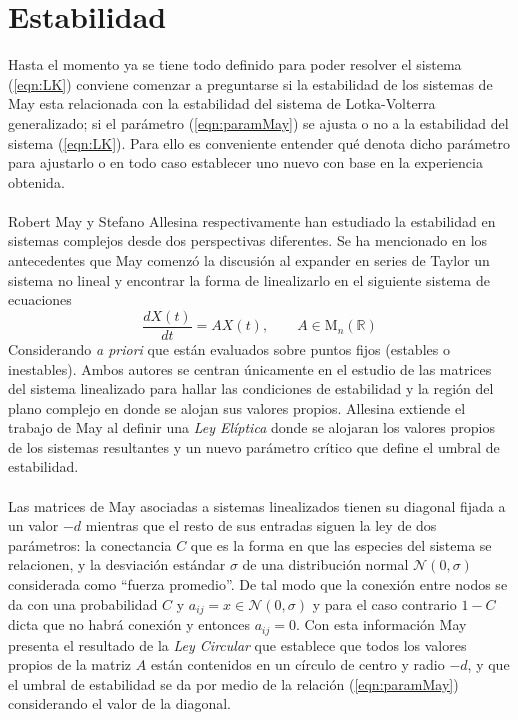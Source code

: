 \section{Estabilidad}

Hasta el momento ya se tiene todo definido para poder resolver el sistema (\ref{eqn:LK}) conviene comenzar a preguntarse si la estabilidad de los sistemas de May esta relacionada con la estabilidad del sistema de Lotka-Volterra generalizado; si el parámetro (\ref{eqn:paramMay}) se ajusta o no a la estabilidad del sistema (\ref{eqn:LK}). Para ello es conveniente entender qué denota dicho parámetro para ajustarlo o en todo caso establecer uno nuevo con base en la experiencia obtenida.\\
\\
Robert May \cite{may2019stability} y Stefano Allesina \cite{allesina2012stability} respectivamente han estudiado la estabilidad en sistemas complejos desde dos perspectivas diferentes. Se ha mencionado en los antecedentes que May comenzó la discusión al expander en series de Taylor un sistema no lineal y encontrar la forma de linealizarlo en el siguiente sistema de ecuaciones
\begin{equation}\label{eqn:sistemasMay}
	\frac{dX(t)}{dt}=AX(t),\qquad A\in\mathrm{M}_n(\mathbb{R})
\end{equation}
Considerando \textit{a priori} que están evaluados sobre puntos fijos (estables o inestables). Ambos autores se centran únicamente en el estudio de las matrices del sistema linealizado para hallar las condiciones de estabilidad y la región del plano complejo en donde se alojan sus valores propios. Allesina extiende el trabajo de May al definir una \textit{Ley Elíptica} donde se alojaran los valores propios de los sistemas resultantes y un nuevo parámetro crítico que define el umbral de estabilidad. 
\\
\\
Las matrices de May asociadas a sistemas linealizados tienen su diagonal fijada a un valor $-d$ mientras que el resto de sus entradas siguen la ley de dos parámetros: la conectancia $C$ que es la forma en que las especies del sistema se relacionen, y la desviación estándar $\sigma$ de una distribución normal $\mathcal{N}(0,\sigma)$ considerada como ``fuerza promedio''. De tal modo que la conexión entre nodos se da con una probabilidad $C$ y $a_{ij}=x\in\mathcal{N}(0,\sigma)$ y para el caso contrario $1-C$ dicta que no habrá conexión y entonces $a_{ij}=0$. Con esta información May presenta el resultado de la \textit{Ley Circular} que establece que todos los valores propios de la matriz $A$ están contenidos en un círculo de centro y radio $-d$, y que el umbral de estabilidad se da por medio de la relación (\ref{eqn:paramMay}) considerando el valor de la diagonal. 
